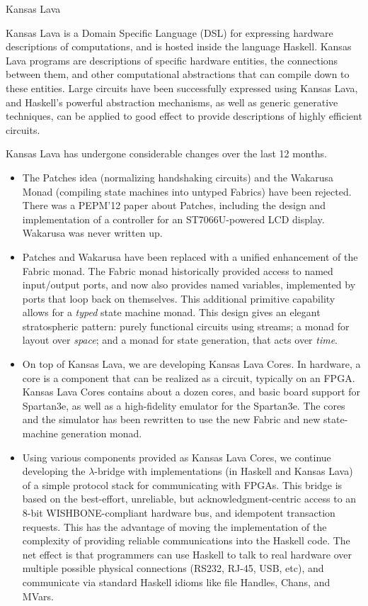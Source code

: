 \begin{hcarentry}[updated]{Kansas Lava}
\label{klava}
\makeheader

Kansas Lava is a Domain Specific Language (DSL) for expressing
hardware descriptions of computations, and is hosted inside the
language Haskell. Kansas Lava programs are descriptions of specific hardware
entities, the connections between them, and other computational abstractions
that can compile down to these entities. Large circuits have been successfully
expressed using Kansas Lava, and Haskell's powerful abstraction mechanisms, as
well as generic generative techniques, can be applied to good effect to provide
descriptions of highly efficient circuits.

Kansas Lava has undergone considerable changes over the last 12 months.
\begin{itemize}
\item The Patches idea (normalizing handshaking circuits) and the Wakarusa
Monad (compiling state machines into untyped Fabrics) have been rejected. There
was a PEPM'12 paper about Patches,
including the design and implementation of a controller for an ST7066U-powered
LCD display.
Wakarusa was never written up.

\item Patches and Wakarusa have been replaced with a unified enhancement of the Fabric
monad. The Fabric monad historically provided access to named input/output ports,
and now also provides named variables, implemented by ports that loop back on
themselves. This additional primitive capability allows for a {\em typed\/}
state machine monad.
This design gives an elegant stratospheric pattern: purely functional circuits using streams;
a monad for layout over {\em space\/}; and a monad for state generation,
that acts over {\em time\/}.

\item 
On top of Kansas Lava, we are developing Kansas Lava Cores.
In hardware, a core is a component
that can be realized as a circuit, typically on an FPGA. Kansas Lava Cores
contains about a dozen cores, and basic board support for Spartan3e,
as well as a high-fidelity emulator for the Spartan3e. The
cores and the simulator has been rewritten to use the new Fabric
and new state-machine generation monad.

\item Using various components provided as Kansas Lava Cores, 
we continue developing the $\lambda$-bridge 
with implementations (in Haskell and
Kansas Lava) of a simple protocol stack for communicating with FPGAs.
This bridge is based on the best-effort, unreliable,
but acknowledgment-centric access to an 8-bit WISHBONE-compliant hardware bus,
and idempotent transaction requests.
This has the advantage of moving the implementation
of the complexity of providing reliable communications into the Haskell
code. The net effect is that programmers can use Haskell to
talk to real hardware over multiple possible physical connections
(RS232, RJ-45, USB, etc), and communicate via standard Haskell
idioms like file Handles, Chans, and MVars.


\end{itemize}
\end{hcarentry}

